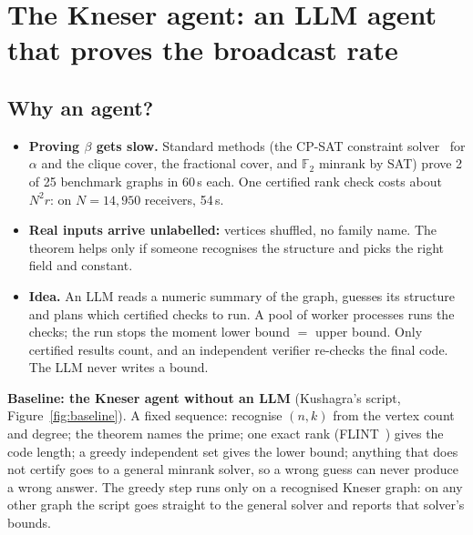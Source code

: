 \section{The Kneser agent: an LLM agent that proves the broadcast rate}\label{sec:agent}

\subsection{Why an agent?}
\begin{itemize}
  \item \textbf{Proving $\beta$ gets slow.} Standard methods (the CP-SAT constraint solver~\cite{cpsat} for $\alpha$ and
  the clique cover, the fractional cover, and $\mathbb{F}_2$ minrank by SAT) prove 2 of 25 benchmark graphs in 60\,s each. One
  certified rank check costs about $N^2r$: on $N=14{,}950$ receivers, 54\,s.
  \item \textbf{Real inputs arrive unlabelled:} vertices shuffled, no family name. The theorem helps only if someone
  recognises the structure and picks the right field and constant.
  \item \textbf{Idea.} An LLM reads a numeric summary of the graph, guesses its structure and plans which certified
  checks to run. A pool of worker processes runs the checks; the run stops the moment lower bound $=$ upper bound.
  Only certified results count, and an independent verifier re-checks the final code. The LLM never writes a bound.
\end{itemize}

\textbf{Baseline: the Kneser agent without an LLM} (Kushagra's script, Figure~\ref{fig:baseline}). A fixed sequence:
recognise $(n,k)$ from the vertex count and degree; the theorem names the prime; one exact rank (FLINT~\cite{flint})
gives the code length; a greedy independent set gives the lower bound; anything that does not certify goes to a
general minrank solver, so a wrong guess can never produce a wrong answer. The greedy step runs only on a recognised
Kneser graph: on any other graph the script goes straight to the general solver and reports that solver's bounds.

